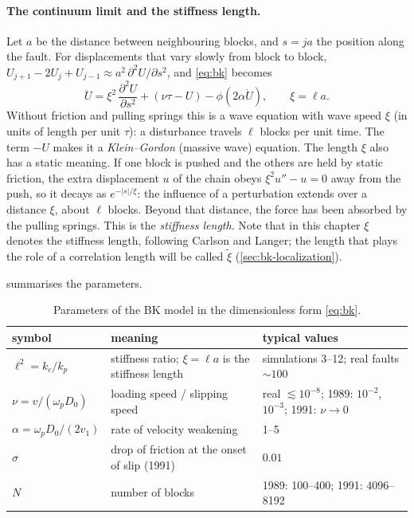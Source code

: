 \paragraph{The continuum limit and the stiffness length.} Let $a$ be the distance between neighbouring blocks,
and $s = ja$ the position along the fault. For displacements that vary slowly from block to block,
$U_{j+1}-2U_j+U_{j-1}\approx a^2\,\partial^2U/\partial s^2$, and \cref{eq:bk} becomes
\begin{equation}
  \ddot U = \xi^2\,\frac{\partial^2U}{\partial s^2} + (\nu\tau - U) - \phi(2\alpha\dot U),\qquad \xi = \ell a .
  \label{eq:bk-cont}
\end{equation}
Without friction and pulling springs this is a wave equation with wave speed $\xi$ (in units of length per unit
$\tau$): a disturbance travels $\ell$ blocks per unit time. The term $-U$ makes it a \emph{Klein--Gordon} (massive
wave) equation. The length $\xi$ also has a static meaning. If one block is pushed and the others are held by
static friction, the extra displacement $u$ of the chain obeys $\xi^2u'' - u = 0$ away from the push, so it decays
as $e^{-|s|/\xi}$: the influence of a perturbation extends over a distance $\xi$, about $\ell$ blocks. Beyond that
distance, the force has been absorbed by the pulling springs. This is the \emph{stiffness length}. Note that in
this chapter $\xi$ denotes the stiffness length, following Carlson and Langer; the length that plays the role of a
correlation length will be called $\tilde\xi$ (\cref{sec:bk-localization}).

 summarises the parameters.

\begin{table}[t]
\centering
\caption{Parameters of the BK model in the dimensionless form \cref{eq:bk}.}
\label{tab:bk-params}
\begin{tabular}{@{}lp{58mm}p{50mm}@{}}
\toprule
symbol & meaning & typical values \\
\midrule
$\ell^2=k_c/k_p$ & stiffness ratio; $\xi=\ell a$ is the stiffness length & simulations 3--12; real faults $\sim100$ \\
$\nu=v/(\omega_pD_0)$ & loading speed / slipping speed & real $\lesssim10^{-8}$; 1989: $10^{-2}$, $10^{-3}$; 1991: $\nu\to0$ \\
$\alpha=\omega_pD_0/(2v_1)$ & rate of velocity weakening & 1--5 \\
$\sigma$ & drop of friction at the onset of slip (1991) & $0.01$ \\
$N$ & number of blocks & 1989: 100--400; 1991: 4096--8192 \\
\bottomrule
\end{tabular}
\end{table}

